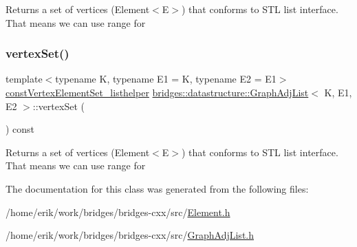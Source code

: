 Returns a set of vertices (Element$<$\+E$>$) that conforms to S\+TL list interface. That means we can use range for \mbox{\label{classbridges_1_1datastructure_1_1_graph_adj_list_a5ef96f5df21b2f9743b7bb79c10cf090}} 
\subsubsection{\texorpdfstring{vertex\+Set()}{vertexSet()}\hspace{0.1cm}{\footnotesize\ttfamily [2/2]}}
{\footnotesize\ttfamily template$<$typename K, typename E1 = K, typename E2 = E1$>$ \\
\hyperlink{classbridges_1_1datastructure_1_1_graph_adj_list_1_1const_vertex_element_set__listhelper}{const\+Vertex\+Element\+Set\+\_\+listhelper} \hyperlink{classbridges_1_1datastructure_1_1_graph_adj_list}{bridges\+::datastructure\+::\+Graph\+Adj\+List}$<$ K, E1, E2 $>$\+::vertex\+Set (\begin{DoxyParamCaption}{ }\end{DoxyParamCaption}) const\hspace{0.3cm}{\ttfamily [inline]}}

Returns a set of vertices (Element$<$\+E$>$) that conforms to S\+TL list interface. That means we can use range for 

The documentation for this class was generated from the following files\+:\begin{DoxyCompactItemize}
\item 
/home/erik/work/bridges/bridges-\/cxx/src/\hyperlink{_element_8h}{Element.\+h}\item 
/home/erik/work/bridges/bridges-\/cxx/src/\hyperlink{_graph_adj_list_8h}{Graph\+Adj\+List.\+h}\end{DoxyCompactItemize}
